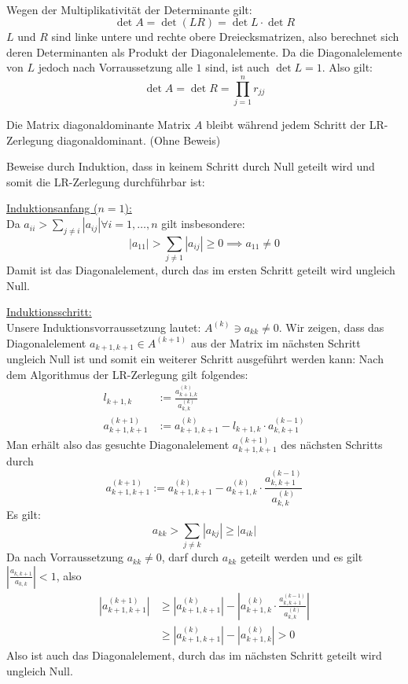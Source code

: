 \documentclass{mywork}
\begin{document}
\setcounter{aufgabe}{2}
\begin{aufgabe}\\
	Wegen der Multiplikativität der Determinante gilt:
	\[
		\det A = \det (LR) = \det L \cdot \det R
	\]
	$L$ und $R$ sind linke untere und rechte obere Dreiecksmatrizen, also berechnet sich deren Determinanten als Produkt der Diagonalelemente.
	Da die Diagonalelemente von $L$ jedoch nach Vorraussetzung alle $1$ sind, ist auch $\det L=1$.
	Also gilt:
	\[
		\det A = \det R = \prod_{j=1}^nr_{jj}
	\]
\end{aufgabe}
\newpage
\begin{aufgabe}
	\begin{lem*}
		Die Matrix diagonaldominante Matrix $A$ bleibt während jedem Schritt der LR-Zerlegung diagonaldominant.
		(Ohne Beweis)
	\end{lem*}\vspace{1em}

	Beweise durch Induktion, dass in keinem Schritt durch Null geteilt wird und somit die LR-Zerlegung durchführbar ist:
	
	\underline{Induktionsanfang ($n=1$):}\\
	Da $a_{ii}>\sum_{j\neq i}|a_{ij}| \forall i=1,\dotsc,n$ gilt insbesondere:
	\[
		|a_{11}|>\sum_{j\neq 1}|a_{ij}| \ge 0 \implies a_{11} \neq 0
	\]
	Damit ist das Diagonalelement, durch das im ersten Schritt geteilt wird ungleich Null.
	
	\underline{Induktionsschritt:}\\
	Unsere Induktionsvorraussetzung lautet: $A^{(k)}\ni a_{kk}\neq 0$.
	Wir zeigen, dass das Diagonalelement $a_{k+1,k+1}\in A^{(k+1)}$ aus der Matrix im nächsten Schritt ungleich Null ist und somit ein weiterer Schritt ausgeführt werden kann:
	Nach dem Algorithmus der LR-Zerlegung gilt folgendes:
	\begin{align*}
		l_{k+1,k} &:= \frac {a_{k+1,k}^{(k)}}{a_{k,k}^{(k)}}\\
		a_{k+1,k+1}^{(k+1)} &:= a_{k+1,k+1}^{(k)} - l_{k+1,k}\cdot a_{k,k+1}^{(k-1)}
	\end{align*}
	Man erhält also das gesuchte Diagonalelement $a_{k+1,k+1}^{(k+1)}$ des nächsten Schritts durch 
	\[
		a_{k+1,k+1}^{(k+1)} := a_{k+1,k+1}^{(k)} - a_{k+1,k}^{(k)}\cdot \frac{ a_{k,k+1}^{(k-1)}}{a_{k,k}^{(k)}}
	\]
	Es gilt:
	\[
		a_{kk} > \sum_{j\neq k}|a_{kj}| \ge |a_{ik}|
	\]
	Da nach Vorraussetzung $a_{kk}\neq 0$, darf durch $a_{kk}$ geteilt werden und es gilt $\left|\frac{a_{k,k+1}}{a_{k,k}}\right|<1$, also
	\begin{align*}
		\left|a_{k+1,k+1}^{(k+1)}\right| &\ge \left|a_{k+1,k+1}^{(k)}\right| - \left|a_{k+1,k}^{(k)}\cdot \frac{ a_{k,k+1}^{(k-1)}}{a_{k,k}^{(k)}}\right|\\
																										&\ge \left|a_{k+1,k+1}^{(k)}\right| - \left|a_{k+1,k}^{(k)}\right| > 0
	\end{align*}
	Also ist auch das Diagonalelement, durch das im nächsten Schritt geteilt wird ungleich Null.
\end{aufgabe}
\end{document}
